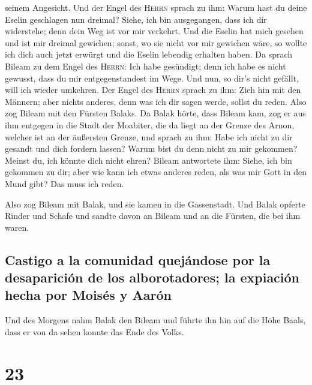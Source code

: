 seinem Angesicht.  Und der Engel des \textsc{Herrn}
sprach zu ihm: Warum hast du deine Eselin geschlagen nun dreimal? Siehe,
ich bin ausgegangen, dass ich dir widerstehe; denn dein Weg ist vor mir
verkehrt.  Und die Eselin hat mich gesehen und ist mir
dreimal gewichen; sonst, wo sie nicht vor mir gewichen wäre, so wollte
ich dich auch jetzt erwürgt und die Eselin lebendig erhalten haben.
 Da sprach Bileam zu dem Engel des \textsc{Herrn}: Ich
habe gesündigt; denn ich habe es nicht gewusst, dass du mir
entgegenstandest im Wege. Und nun, so dir's nicht gefällt, will ich
wieder umkehren.  Der Engel des \textsc{Herrn} sprach zu
ihm: Zieh hin mit den Männern; aber nichts anderes, denn was ich dir
sagen werde, sollst du reden. Also zog Bileam mit den Fürsten Balaks.
 Da Balak hörte, dass Bileam kam, zog er aus ihm entgegen
in die Stadt der Moabiter, die da liegt an der Grenze des Arnon, welcher
ist an der äußersten Grenze,  und sprach zu ihm: Habe ich
nicht zu dir gesandt und dich fordern lassen? Warum bist du denn nicht
zu mir gekommen? Meinst du, ich könnte dich nicht ehren? 
Bileam antwortete ihm: Siehe, ich bin gekommen zu dir; aber wie kann ich
etwas anderes reden, als was mir Gott in den Mund gibt? Das muss ich
reden.

 Also zog Bileam mit Balak, und sie kamen in die
Gassenstadt.  Und Balak opferte Rinder und Schafe und
sandte davon an Bileam und an die Fürsten, die bei ihm waren.

\hypertarget{castigo-a-la-comunidad-quejuxe1ndose-por-la-desapariciuxf3n-de-los-alborotadores-la-expiaciuxf3n-hecha-por-moisuxe9s-y-aaruxf3n}{%
\subsection{Castigo a la comunidad quejándose por la desaparición de los
alborotadores; la expiación hecha por Moisés y
Aarón}\label{castigo-a-la-comunidad-quejuxe1ndose-por-la-desapariciuxf3n-de-los-alborotadores-la-expiaciuxf3n-hecha-por-moisuxe9s-y-aaruxf3n}}

 Und des Morgens nahm Balak den Bileam und führte ihn hin
auf die Höhe Baals, dass er von da sehen konnte das Ende des Volks.

\hypertarget{section-22}{%
\section{23}\label{section-22}}

